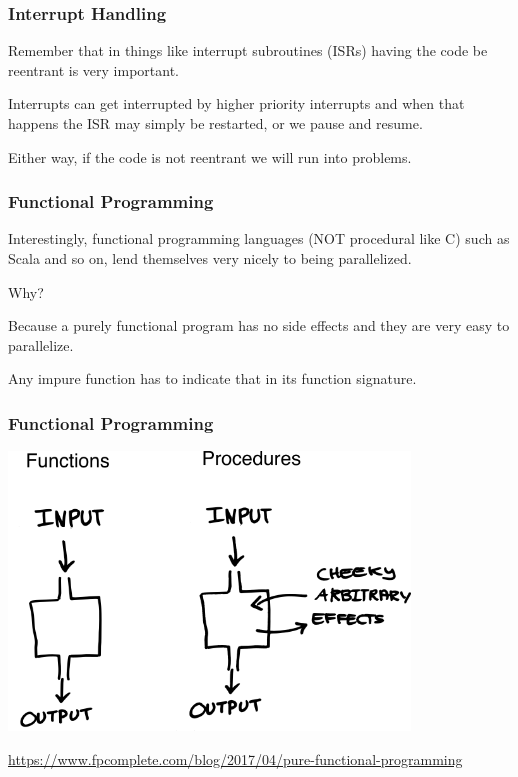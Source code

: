 \begin{frame}
\frametitle{Interrupt Handling}


Remember that in things like interrupt subroutines (ISRs) having the code be reentrant is very important. 

Interrupts can get interrupted by higher priority interrupts and when that happens the ISR may simply be restarted, or we pause and resume.

Either way, if the code is not reentrant we will run into problems.


\end{frame}


\begin{frame}
\frametitle{Functional Programming}

Interestingly, functional programming languages (NOT procedural like C) such as Scala and so on, lend themselves very nicely to being parallelized. 

Why? 

Because a purely functional program has no side effects and they are very easy to parallelize.

Any impure function has to indicate that in its function signature.

\end{frame}



\begin{frame}
\frametitle{Functional Programming}

\begin{center}
	\includegraphics[width=0.8\textwidth]{images/functional.png}
\end{center}
{\small \url{https://www.fpcomplete.com/blog/2017/04/pure-functional-programming}}


\end{frame}



